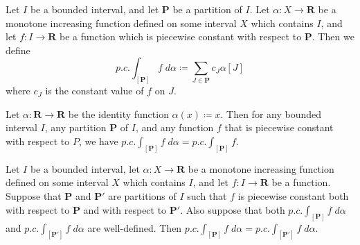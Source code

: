 \begin{definition}\label{11.8.5}
    Let \(I\) be a bounded interval, and let \(\mathbf{P}\) be a partition of \(I\).
    Let \(\alpha : X \to \mathbf{R}\) be a monotone increasing function defined on some interval \(X\) which contains \(I\), and let \(f : I \to \mathbf{R}\) be a function which is piecewise constant with respect to \(\mathbf{P}\).
    Then we define
    \[
        p.c. \int_{[\mathbf{P}]} f \; d \alpha \coloneqq \sum_{J \in \mathbf{P}} c_J \alpha[J]
    \]
    where \(c_J\) is the constant value of \(f\) on \(J\).
\end{definition}

\setcounter{theorem}{6}
\begin{example}\label{11.8.7}
    Let \(\alpha : \mathbf{R} \to \mathbf{R}\) be the identity function \(\alpha(x) \coloneqq x\).
    Then for any bounded interval \(I\), any partition \(\mathbf{P}\) of \(I\), and any function \(f\) that is piecewise constant with respect to \(P\), we have \(p.c. \int_{[\mathbf{P}]} f \; d \alpha = p.c. \int_{[\mathbf{P}]} f\).
\end{example}

\begin{proposition}\label{11.8.8}
    Let \(I\) be a bounded interval, let \(\alpha : X \to \mathbf{R}\) be a monotone increasing function defined on some interval \(X\) which contains \(I\), and let \(f : I \to \mathbf{R}\) be a function.
    Suppose that \(\mathbf{P}\) and \(\mathbf{P}'\) are partitions of \(I\) such that \(f\) is piecewise constant both with respect to \(\mathbf{P}\) and with respect to \(\mathbf{P}'\).
    Also suppose that both \(p.c. \int_{[\mathbf{P}]} f \; d \alpha\) and \(p.c. \int_{[\mathbf{P}']} f \; d \alpha\) are well-defined.
    Then \(p.c. \int_{[\mathbf{P}]} f \; d \alpha = p.c. \int_{[\mathbf{P}']} f \; d \alpha\).
\end{proposition}

